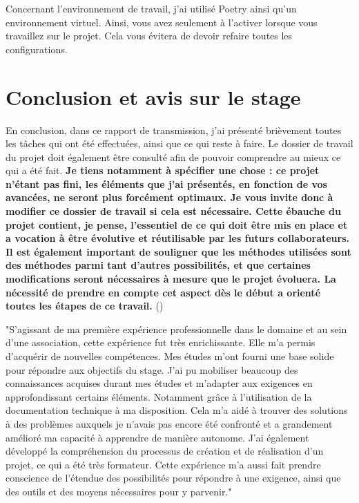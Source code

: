 \documentclass[12pt]{article}
\begin{document}
Concernant l'environnement de travail, j'ai utilisé Poetry ainsi qu'un environnement 
virtuel. Ainsi, vous avez seulement à l'activer lorsque vous travaillez sur le projet.
 Cela vous évitera de devoir refaire toutes les configurations.

\section{Conclusion et avis sur le stage}

En conclusion, dans ce rapport de transmission, j'ai présenté brièvement toutes les 
tâches qui ont été effectuées, ainsi que ce qui reste à faire. Le dossier de travail du 
projet doit également être consulté afin de pouvoir comprendre au mieux ce qui a été fait.
\textbf{Je tiens notamment à spécifier une chose : ce projet n'étant pas fini, les éléments 
que j'ai présentés, en fonction de vos avancées, ne seront plus forcément optimaux. Je vous 
invite donc à modifier ce dossier de travail si cela est nécessaire. Cette ébauche du projet 
contient, je pense, l'essentiel de ce qui doit être mis en place et a vocation à être évolutive 
et réutilisable par les futurs collaborateurs. Il est également important de souligner que 
les méthodes utilisées sont des méthodes parmi tant d'autres possibilités, et que 
certaines modifications seront nécessaires à mesure que le projet évoluera. 
La nécessité de prendre en compte cet aspect dès le début a orienté toutes 
les étapes de ce travail.} (\cite{memoir})\newline


"S'agissant de ma première expérience professionnelle dans le domaine et au sein d'une 
association, cette expérience fut très enrichissante. Elle m'a permis d'acquérir de 
nouvelles compétences. Mes études m'ont fourni une base solide pour répondre aux objectifs 
du stage. J'ai pu mobiliser beaucoup des connaissances acquises durant mes études et 
m'adapter aux exigences en approfondissant certains éléments. Notamment grâce à l'utilisation 
de la documentation technique à ma disposition. Cela m'a aidé à trouver des solutions à des 
problèmes auxquels je n'avais pas encore été confronté et a grandement amélioré ma 
capacité à apprendre de manière autonome. J'ai également développé la compréhension 
du processus de création et de réalisation d'un projet, ce qui a été très formateur. 
Cette expérience m'a aussi fait prendre conscience de l'étendue des possibilités 
pour répondre à une exigence, ainsi que des outils et des moyens nécessaires pour y parvenir." 
\cite{memoir} \newline
\end{document}
